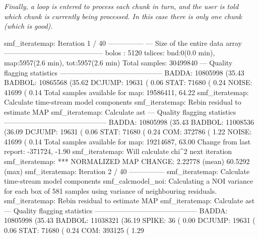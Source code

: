 \emph{Finally, a loop is entered to process each chunk in turn, and the
user is told which chunk is currently being processed. In this
case there  is only one chunk (which is good).}

\begin{terminalv}
smf_iteratemap: Iteration 1 / 40 ---------------
--- Size of the entire data array ------------------------------------------
bolos  : 5120
tslices: bnd:0(0.0 min), map:5957(2.6 min), tot:5957(2.6 min)
Total samples: 30499840
--- Quality flagging statistics --------------------------------------------
 BADDA:   10805998 (35.43%
BADBOL:   10865568 (35.62%
DCJUMP:      19631 ( 0.06%
  STAT:      71680 ( 0.24%
 NOISE:      41699 ( 0.14%
Total samples available for map:   19586411, 64.22%
smf_iteratemap: Calculate time-stream model components
smf_iteratemap: Rebin residual to estimate MAP
smf_iteratemap: Calculate ast
--- Quality flagging statistics --------------------------------------------
 BADDA:   10805998 (35.43%
BADBOL:   11008536 (36.09%
DCJUMP:      19631 ( 0.06%
  STAT:      71680 ( 0.24%
   COM:     372786 ( 1.22%
 NOISE:      41699 ( 0.14%
Total samples available for map:   19214687, 63.00%
     Change from last report:    -371724, -1.90%
smf_iteratemap: Will calculate chi^2 next iteration
smf_iteratemap: *** NORMALIZED MAP CHANGE: 2.22778 (mean) 60.5292 (max)
smf_iteratemap: Iteration 2 / 40 ---------------
smf_iteratemap: Calculate time-stream model components
smf_calcmodel_noi: Calculating a NOI variance for each box of 581 samples
using variance of neighbouring residuals.
smf_iteratemap: Rebin residual to estimate MAP
smf_iteratemap: Calculate ast
--- Quality flagging statistics --------------------------------------------
 BADDA:   10805998 (35.43%
BADBOL:   11038321 (36.19%
 SPIKE:         36 ( 0.00%
DCJUMP:      19631 ( 0.06%
  STAT:      71680 ( 0.24%
   COM:     393125 ( 1.29%

\end{terminalv}
